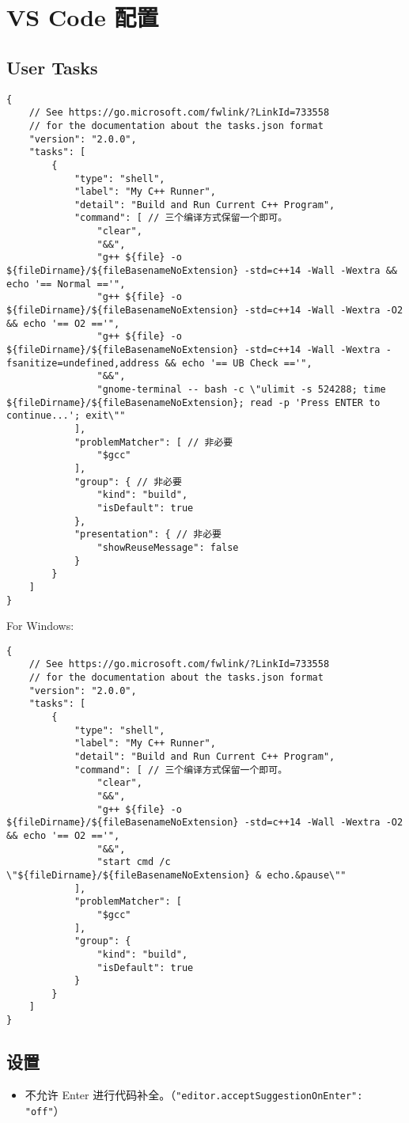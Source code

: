 \section{VS Code 配置}

\subsection{User Tasks}

\begin{verbatim}
{
    // See https://go.microsoft.com/fwlink/?LinkId=733558
    // for the documentation about the tasks.json format
    "version": "2.0.0",
    "tasks": [
        {
            "type": "shell",
            "label": "My C++ Runner",
            "detail": "Build and Run Current C++ Program",
            "command": [ // 三个编译方式保留一个即可。
                "clear",
                "&&",
                "g++ ${file} -o ${fileDirname}/${fileBasenameNoExtension} -std=c++14 -Wall -Wextra && echo '== Normal =='",
                "g++ ${file} -o ${fileDirname}/${fileBasenameNoExtension} -std=c++14 -Wall -Wextra -O2 && echo '== O2 =='",
                "g++ ${file} -o ${fileDirname}/${fileBasenameNoExtension} -std=c++14 -Wall -Wextra -fsanitize=undefined,address && echo '== UB Check =='",
                "&&",
                "gnome-terminal -- bash -c \"ulimit -s 524288; time ${fileDirname}/${fileBasenameNoExtension}; read -p 'Press ENTER to continue...'; exit\""
            ],
            "problemMatcher": [ // 非必要
                "$gcc"
            ],
            "group": { // 非必要
                "kind": "build",
                "isDefault": true
            },
            "presentation": { // 非必要
                "showReuseMessage": false
            }
        }
    ]
}
\end{verbatim}

For Windows:

\begin{verbatim}
{
    // See https://go.microsoft.com/fwlink/?LinkId=733558
    // for the documentation about the tasks.json format
    "version": "2.0.0",
    "tasks": [
        {
            "type": "shell",
            "label": "My C++ Runner",
            "detail": "Build and Run Current C++ Program",
            "command": [ // 三个编译方式保留一个即可。
                "clear",
                "&&",
                "g++ ${file} -o ${fileDirname}/${fileBasenameNoExtension} -std=c++14 -Wall -Wextra -O2 && echo '== O2 =='",
                "&&",
                "start cmd /c \"${fileDirname}/${fileBasenameNoExtension} & echo.&pause\""
            ],
            "problemMatcher": [
                "$gcc"
            ],
            "group": {
                "kind": "build",
                "isDefault": true
            }
        }
    ]
}
\end{verbatim}

\subsection{设置}

\begin{itemize}
    \item 不允许 Enter 进行代码补全。（\lstinline|"editor.acceptSuggestionOnEnter": "off"|）
\end{itemize}